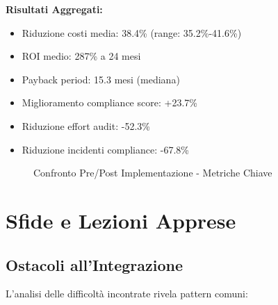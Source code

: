 \textbf{Risultati Aggregati:}
\begin{itemize}
\item Riduzione costi media: 38.4\% (range: 35.2\%-41.6\%)
\item ROI medio: 287\% a 24 mesi
\item Payback period: 15.3 mesi (mediana)
\item Miglioramento compliance score: +23.7\%
\item Riduzione effort audit: -52.3\%
\item Riduzione incidenti compliance: -67.8\%
\end{itemize}

\begin{figure}[H]
\centering
{}
\caption{Confronto Pre/Post Implementazione - Metriche Chiave}
\end{figure}

\section{Sfide e Lezioni Apprese}

\subsection{Ostacoli all'Integrazione}

L'analisi delle difficoltà incontrate rivela pattern comuni:

